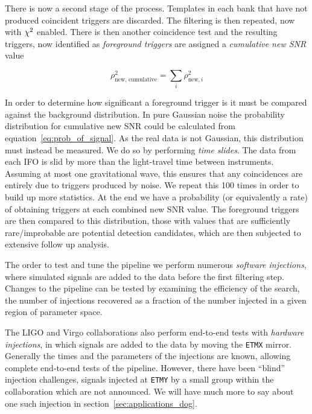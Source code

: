 There is now a second stage of the process.  Templates in each bank
that have not produced coincident triggers are discarded.  The
filtering is then repeated, now with $\chi^2$ enabled.  There is then
another coincidence test and the resulting triggers, now identified as
\emph{foreground triggers} are assigned a \emph{cumulative new SNR}
value

\begin{equation*}
\rho_{\textrm{new, cumulative}}^2 = \sum_i \rho_{\textrm{new}, i}^2
\end{equation*}


In order to determine how significant a foreground trigger is it must
be compared against the background distribution.  In pure Gaussian
noise the probability distribution for cumulative new SNR could be
calculated from equation~\ref{eq:prob_of_signal}.  As the real data is
not Gaussian, this distribution must instead be measured.  We do so by
performing \emph{time slides}.  The data from each IFO is slid by more
than the light-travel time between instruments.  Assuming at most one
gravitational wave, this ensures that any coincidences are entirely
due to triggers produced by noise.  We repeat this 100 times in order
to build up more statistics.  At the end we have a probability (or
equivalently a rate) of obtaining triggers at each combined new SNR
value.  The foreground triggers are then compared to this
distribution, those with values that are sufficiently rare/improbable
are potential detection candidates, which are then subjected to
extensive follow up analysis.

The order to test and tune the pipeline we perform numerous
\emph{software injections}, where simulated signals are added to the
data before the first filtering step.  Changes to the pipeline can be
tested by examining the efficiency of the search, the number of
injections recovered as a fraction of the number injected in a given
region of parameter space.

The LIGO and Virgo collaborations also perform end-to-end tests with
\emph{hardware injections}, in which signals are added to the data by
moving the \texttt{ETMX} mirror.  Generally the times and the
parameters of the injections are known, allowing complete end-to-end
tests of the pipeline.  However, there have been ``blind'' injection
challenges, signals injected at \texttt{ETMY} by a small group within
the collaboration which are not announced.  We will have much more to
say about one such injection in section~\ref{sec:applications_dog}.

